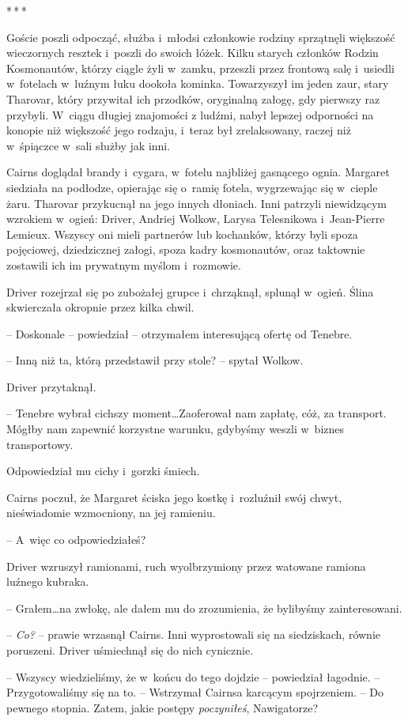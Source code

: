 \documentclass[oneside,polish,12pt,sfheadings]{mwbk}
\newcommand{\threeast}{\bigskip\par\centerline{*\,*\,*}\medskip\par}%
\begin{document}
\threeast

Goście poszli odpocząć, służba i~młodsi członkowie rodziny sprzątnęli
większość wieczornych resztek i~poszli do swoich łóżek. Kilku starych
członków Rodzin Kosmonautów, którzy ciągle żyli w~zamku, przeszli przez
frontową salę i~usiedli w~fotelach w~luźnym łuku dookoła kominka.
Towarzyszył im jeden zaur, stary Tharovar, który przywitał ich przodków,
oryginalną załogę, gdy pierwszy raz przybyli. W~ciągu długiej znajomości
z ludźmi, nabył lepszej odporności na konopie niż większość jego
rodzaju, i~teraz był zrelaksowany, raczej niż w~śpiączce w~sali służby
jak inni.

Cairns doglądał brandy i~cygara, w~fotelu najbliżej gasnącego ognia.
Margaret siedziała na podłodze, opierając się o~ramię fotela,
wygrzewając się w~cieple żaru. Tharovar przykucnął na jego innych
dłoniach. Inni patrzyli niewidzącym wzrokiem w~ogień: Driver, Andriej
Wolkow, Larysa Telesnikowa i~Jean-Pierre Lemieux. Wszyscy oni mieli
partnerów lub kochanków, którzy byli spoza pojęciowej, dziedzicznej
załogi, spoza kadry kosmonautów, oraz taktownie zostawili ich im
prywatnym myślom i~rozmowie.

Driver rozejrzał się po zubożałej grupce i~chrząknął, splunął w~ogień.
Ślina skwierczała okropnie przez kilka chwil.

-- Doskonale -- powiedział -- otrzymałem interesującą ofertę od Tenebre.

-- Inną niż ta, którą przedstawił przy stole? -- spytał Wolkow.

Driver przytaknął. 

-- Tenebre wybrał cichszy moment\ldots Zaoferował nam
zapłatę, cóż, za transport. Mógłby nam zapewnić korzystne warunku,
gdybyśmy weszli w~biznes transportowy.

Odpowiedział mu cichy i~gorzki śmiech.

Cairns poczuł, że Margaret ściska jego kostkę i~rozluźnił swój chwyt,
nieświadomie wzmocniony, na jej ramieniu.

-- A~więc co odpowiedziałeś?

Driver wzruszył ramionami, ruch wyolbrzymiony przez watowane ramiona
luźnego kubraka. 

-- Grałem\ldots na zwłokę, ale dałem mu do zrozumienia, że
bylibyśmy zainteresowani.

-- \emph{ Co? } -- prawie wrzasnął Cairns. Inni wyprostowali się na
siedziskach, równie poruszeni. Driver uśmiechnął się do nich cynicznie.

-- Wszyscy wiedzieliśmy, że w~końcu do tego dojdzie -- powiedział
łagodnie. -- Przygotowaliśmy się na to. -- Wstrzymał Cairnsa karcącym
spojrzeniem. -- Do pewnego stopnia. Zatem, jakie postępy
\emph{poczyniłeś}, Nawigatorze?
\end{document}
